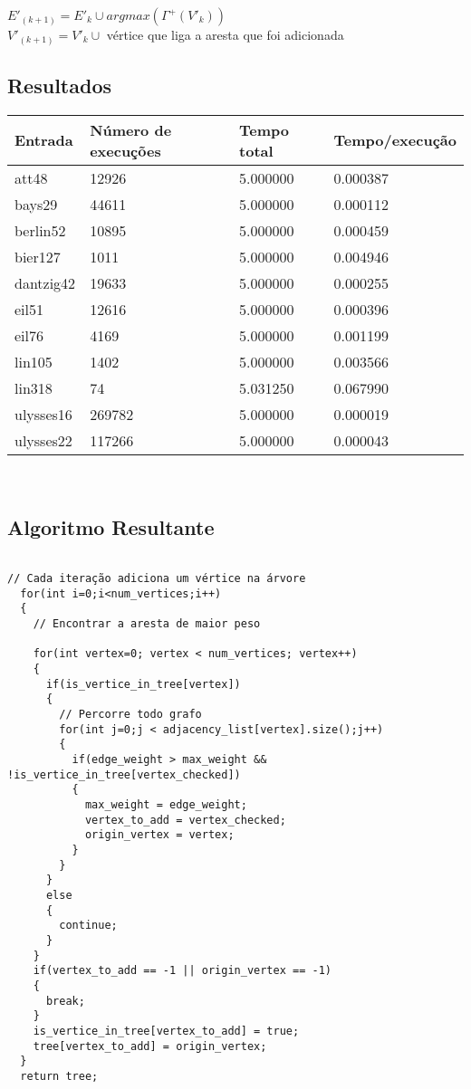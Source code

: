 \documentclass[12pt]{article}
\begin{document}
$E'_{(k+1)} = E'_k \cup {argmax(\Gamma^+(V'_k))}$\\
$V'_{(k+1)} = V'_k \cup$ vértice que liga a aresta que foi adicionada\\
\subsection{ Resultados }
\begin{tabular}{llll}
  \toprule
  \textbf{Entrada}  &  \textbf{Número de execuções} &   \textbf{Tempo total} &  \textbf{Tempo/execução} \\
  \midrule
att48     & 12926 & 5.000000 & 0.000387 \\
bays29    & 44611 & 5.000000 & 0.000112 \\
berlin52  & 10895 & 5.000000 & 0.000459 \\
bier127   & 1011 & 5.000000 & 0.004946 \\
dantzig42 & 19633 & 5.000000 & 0.000255 \\
eil51     & 12616 & 5.000000 & 0.000396 \\
eil76     & 4169 & 5.000000 & 0.001199 \\
lin105    & 1402 & 5.000000 & 0.003566 \\
lin318    & 74 & 5.031250 & 0.067990 \\
ulysses16 & 269782 & 5.000000 & 0.000019 \\
ulysses22 & 117266 & 5.000000 & 0.000043 \\

  \bottomrule 
\end{tabular}\\
\subsection{ Algoritmo Resultante }
\begin{lstlisting}

// Cada iteração adiciona um vértice na árvore
  for(int i=0;i<num_vertices;i++)
  {
    // Encontrar a aresta de maior peso

    for(int vertex=0; vertex < num_vertices; vertex++)
    {
      if(is_vertice_in_tree[vertex])
      {
        // Percorre todo grafo
        for(int j=0;j < adjacency_list[vertex].size();j++)
        {
          if(edge_weight > max_weight && !is_vertice_in_tree[vertex_checked])
          {
            max_weight = edge_weight;
            vertex_to_add = vertex_checked;
            origin_vertex = vertex;
          }
        }
      }
      else
      {
        continue;
      }
    }
    if(vertex_to_add == -1 || origin_vertex == -1)
    {
      break;
    }
    is_vertice_in_tree[vertex_to_add] = true;
    tree[vertex_to_add] = origin_vertex;
  }
  return tree;
\end{lstlisting}
\end{document}

